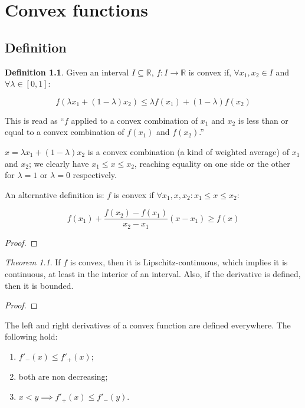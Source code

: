 \documentclass[12pt,a4paper]{report}
\numberwithin{equation}{section}
\theoremstyle{definition}
\newtheorem{definition}{Definition}[section]
\theoremstyle{remark}
\newtheorem{theorem}{Theorem}[section]
\begin{document}
\chapter{Convex functions}

\section{Definition}

\begin{definition}
Given an interval $I \subseteq \mathbb{R}$, $f: I\rightarrow \mathbb{R}$ is convex if, $\forall x_1, x_2 \in I$ and $\forall \lambda \in [0, 1]$:

\begin{equation}
f(\lambda x_1 + (1-\lambda) x_2) \leq \lambda f(x_1) + (1-\lambda)f(x_2)
\end{equation}

This is read as ``$f$ applied to a convex combination of $x_1$ and $x_2$ is less than or equal to a convex combination of $f(x_1)$ and $f(x_2)$.''
\end{definition}

$x = \lambda x_1 + (1-\lambda) x_2$ is a convex combination (a kind of weighted average) of $x_1$ and $x_2$; we clearly have $x_1 \leq x \leq x_2$, reaching equality on one side or the other for $\lambda = 1$ or $\lambda = 0$ respectively.

An alternative definition is: $f$ is convex if $\forall x_1, x, x_2: x_1 \leq x \leq x_2$:

\begin{equation}
f(x_1) + \frac{f(x_2) - f(x_1)}{x_2 - x_1}(x - x_1) \geq f(x)
\end{equation}

\begin{proof}
\end{proof}

\begin{theorem}
If $f$ is convex, then it is Lipschitz-continuous, which implies it is continuous, at least in the interior of an interval. Also, if the derivative is defined, then it is bounded.
\end{theorem}

\begin{proof}
\end{proof}

The left and right derivatives of a convex function are defined everywhere.
The following hold:

\begin{enumerate}
\item $f'_-(x) \leq f'_+ (x)$;
\item both are non decreasing;
\item $x<y \implies f'_+(x) \leq f'_- (y)$.
\end{enumerate}
\end{document}

